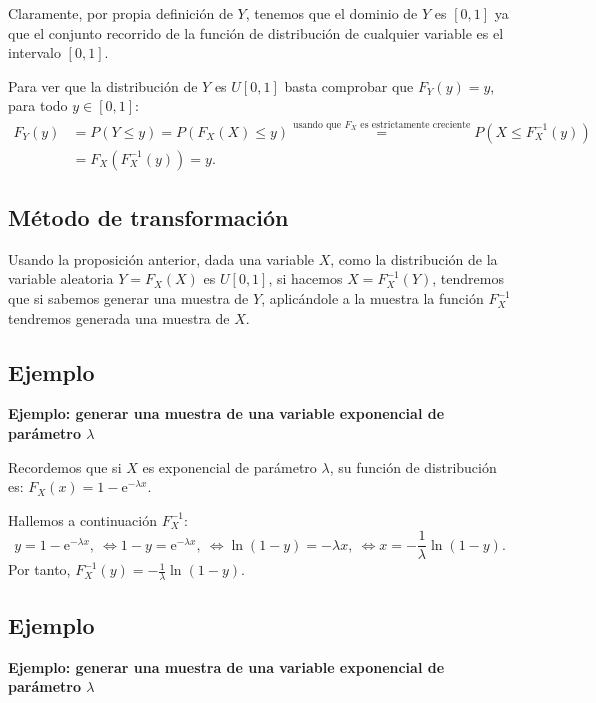 \documentclass[]{book}
\begin{document}
Claramente, por propia definición de \(Y\), tenemos que el dominio de \(Y\) es \([0,1]\) ya que el conjunto recorrido de la función de distribución de cualquier variable es el intervalo \([0,1]\).

Para ver que la distribución de \(Y\) es \(U[0,1]\) basta comprobar que \(F_Y(y)=y\), para todo \(y\in [0,1]\):
\[
\begin{array}{rl}
F_Y(y) & =P(Y\leq y)=P(F_X(X)\leq y)\stackrel{\mbox{usando que $F_X$ es estrictamente creciente}}{=} P(X\leq F_X^{-1}(y)) \\ & =F_X(F_X^{-1}(y))=y.
\end{array}
\]

\hypertarget{muxe9todo-de-transformaciuxf3n-1}{%
\subsection{Método de transformación}\label{muxe9todo-de-transformaciuxf3n-1}}

Usando la proposición anterior, dada una variable \(X\), como la distribución de la variable aleatoria \(Y=F_X(X)\) es \(U[0,1]\), si hacemos \(X=F_X^{-1}(Y)\), tendremos que si sabemos generar una muestra de \(Y\), aplicándole a la muestra la función \(F_X^{-1}\) tendremos generada una muestra de \(X\).

\hypertarget{ejemplo-28}{%
\subsection{Ejemplo}\label{ejemplo-28}}

\textbf{Ejemplo: generar una muestra de una variable exponencial de parámetro \(\lambda\)}

Recordemos que si \(X\) es exponencial de parámetro \(\lambda\), su función de distribución es: \(F_X(x)=1-\mathrm{e}^{-\lambda x}\).

Hallemos a continuación \(F_X^{-1}\):
\[
y=1-\mathrm{e}^{-\lambda x},\ \Leftrightarrow 1-y=\mathrm{e}^{-\lambda x},\ \Leftrightarrow \ln(1-y)=-\lambda x,\ \Leftrightarrow x=-\frac{1}{\lambda}\ln(1-y).
\]
Por tanto, \(F_X^{-1}(y)=-\frac{1}{\lambda}\ln(1-y)\).

\hypertarget{ejemplo-29}{%
\subsection{Ejemplo}\label{ejemplo-29}}

\textbf{Ejemplo: generar una muestra de una variable exponencial de parámetro \(\lambda\)}
\end{document}
